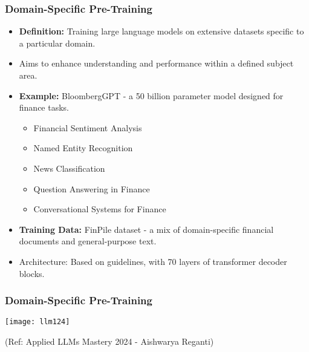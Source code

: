 \begin{frame}[fragile]\frametitle{Domain-Specific Pre-Training}
  \begin{itemize}
    \item \textbf{Definition:} Training large language models on extensive datasets specific to a particular domain.
    \item Aims to enhance understanding and performance within a defined subject area.
    \item \textbf{Example:} BloombergGPT - a 50 billion parameter model designed for finance tasks.
      \begin{itemize}
        \item Financial Sentiment Analysis
        \item Named Entity Recognition
        \item News Classification
        \item Question Answering in Finance
        \item Conversational Systems for Finance
      \end{itemize}
    \item \textbf{Training Data:} FinPile dataset - a mix of domain-specific financial documents and general-purpose text.
    \item Architecture: Based on guidelines, with 70 layers of transformer decoder blocks.
  \end{itemize}
\end{frame}

\begin{frame}[fragile]\frametitle{Domain-Specific Pre-Training}

\begin{center}
\texttt{[image: llm124]}
\end{center}				

{\tiny (Ref: Applied LLMs Mastery 2024 - Aishwarya Reganti)}

\end{frame}

